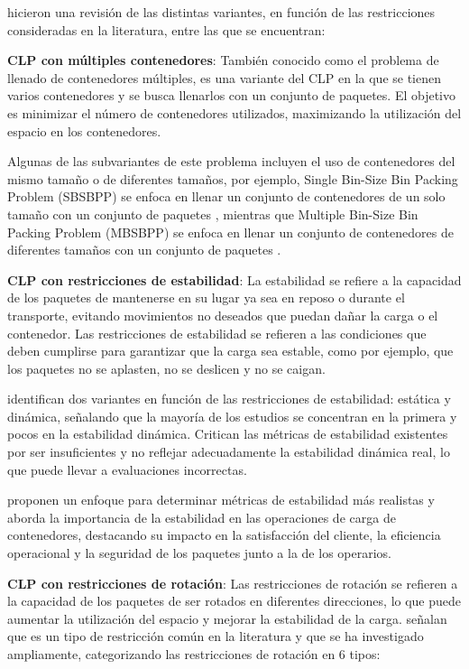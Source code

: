 \documentclass[openany]{article}
\begin{document}
\textcite{Bortfeldt20131} hicieron una revisión de las distintas variantes, en función de las restricciones consideradas en la literatura, entre las que se encuentran:

\textbf{CLP con múltiples contenedores}: También conocido como el problema de llenado de contenedores múltiples, es una variante del CLP en la que se tienen varios contenedores y se busca llenarlos con un conjunto de paquetes. El objetivo es minimizar el número de contenedores utilizados, maximizando la utilización del espacio en los contenedores.

Algunas de las subvariantes de este problema incluyen el uso de contenedores del mismo tamaño o de diferentes tamaños, por ejemplo, Single Bin-Size Bin Packing Problem (SBSBPP) se enfoca en llenar un conjunto de contenedores de un solo tamaño con un conjunto de paquetes \parencite{ren2011priority}, mientras que Multiple Bin-Size Bin Packing Problem (MBSBPP) se enfoca en llenar un conjunto de contenedores de diferentes tamaños con un conjunto de paquetes \parencite{zhao2016comparative}.

\textbf{CLP con restricciones de estabilidad}: La estabilidad se refiere a la capacidad de los paquetes de mantenerse en su lugar ya sea en reposo o durante el transporte, evitando movimientos no deseados que puedan dañar la carga o el contenedor. Las restricciones de estabilidad se refieren a las condiciones que deben cumplirse para garantizar que la carga sea estable, como por ejemplo, que los paquetes no se aplasten, no se deslicen y no se caigan.

\textcite{Bortfeldt20131} identifican dos variantes en función de las restricciones de estabilidad: estática y dinámica, señalando que la mayoría de los estudios se concentran en la primera y pocos en la estabilidad dinámica. Critican las métricas de estabilidad existentes por ser insuficientes y no reflejar adecuadamente la estabilidad dinámica real, lo que puede llevar a evaluaciones incorrectas.

\textcite{RAMOS2015480} proponen un enfoque para determinar métricas de estabilidad más realistas y aborda la importancia de la estabilidad en las operaciones de carga de contenedores, destacando su impacto en la satisfacción del cliente, la eficiencia operacional y la seguridad de los paquetes junto a la de los operarios.


\textbf{CLP con restricciones de rotación}: Las restricciones de rotación se refieren a la capacidad de los paquetes de ser rotados en diferentes direcciones, lo que puede aumentar la utilización del espacio y mejorar la estabilidad de la carga. \textcite{Bortfeldt20131} señalan que es un tipo de restricción común en la literatura y que se ha investigado ampliamente, categorizando las restricciones de rotación en 6 tipos:
\end{document}
